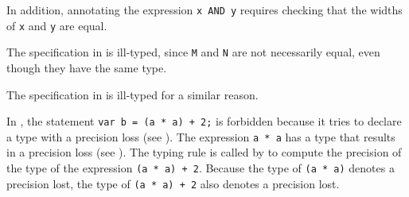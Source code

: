 In addition, annotating the expression \verb|x AND y| requires checking that
the widths of \verb|x| and \verb|y| are equal.

The specification in 
is ill-typed, since \verb|M| and \verb|N| are not necessarily equal, even though they have the same type.

The specification in  is ill-typed for a similar reason.




In , the statement \verb|var b = (a * a) + 2;| is
forbidden because it tries to declare a type with a precision loss (see
).
The expression \verb|a * a| has a type that results in a precision loss (see
).
The typing rule  is called by
 to compute the precision of the type of the
expression \verb|(a * a) + 2|. Because the type of \verb|(a * a)| denotes a
precision lost, the type of \verb|(a * a) + 2| also denotes a precision lost.



